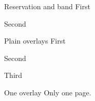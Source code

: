 \documentclass[aspectratio=169]{beamer}
\begin{document}
\florareserve{0pt}{0pt}{\the\paperwidth}{\the\dimexpr 1.5cm\relax}
\begin{frame}{Reservation and band}
  First\pause\par Second
\end{frame}
\floraclearreserve
{}
\begin{frame}{Plain overlays}
  First\pause\par Second\pause\par Third
\end{frame}
\begin{frame}{One overlay}
  Only one page.
\end{frame}
\end{document}
